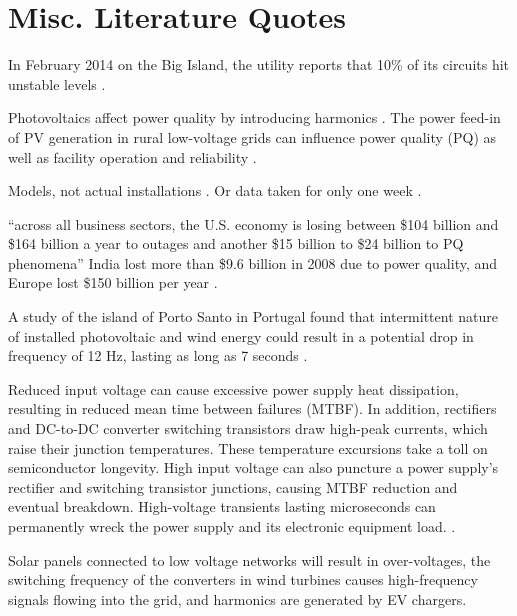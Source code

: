 \section{Misc. Literature Quotes}

In February 2014 on the Big Island, the utility reports that 10\% of its circuits hit unstable levels \cite{trabish_solar_2014}.

Photovoltaics affect power quality by introducing harmonics \cite{anurangi_effects_2017}. The power feed-in of PV generation in rural low-voltage grids can influence power quality (PQ) as well as facility operation and reliability \cite{rita_pinto_impact_2016}.

Models, not actual installations \cite{anurangi_effects_2017,bayindir_effects_2016,farhoodnea_power_2012,shafiullah_experimental_2014}. Or data taken for only one week \cite{kucuk_assessment_2013}.

``across all business sectors, the U.S. economy is losing between \$104 billion and \$164 billion a year to outages and another \$15 billion to \$24 billion to PQ phenomena'' \cite{elphick_summary_2015} India lost more than \$9.6 billion in 2008 due to power quality, and Europe lost \$150 billion per year \cite{laskar_power_2012}.

A study of the island of Porto Santo in Portugal found that intermittent nature of installed photovoltaic and wind energy could result in a potential drop in frequency of 12 Hz, lasting as long as 7 seconds \cite{delgado_solutions_2011}.

Reduced input voltage can cause excessive power supply heat dissipation, resulting in reduced mean time between failures (MTBF). In addition, rectifiers and DC-to-DC converter switching transistors draw high-peak currents, which raise their junction temperatures. These temperature excursions take a toll on semiconductor longevity. High input voltage can also puncture a power supply's rectifier and switching transistor junctions, causing MTBF reduction and eventual breakdown. High-voltage transients lasting microseconds can permanently wreck the power supply and its electronic equipment load. \cite{dedad_when_2008}.

Solar panels connected to low voltage networks will result in over-voltages, the switching frequency of the converters in wind turbines causes high-frequency signals flowing into the grid, and harmonics are generated by EV chargers. \cite{zavoda_power_2018}